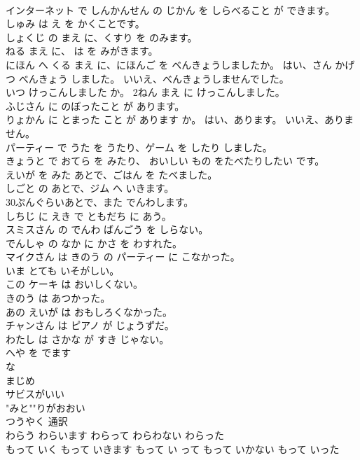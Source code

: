 \documentclass[8pt]{extreport}
\begin{document}
\begin{CJK}{UTF8}{min}
\\	インターネット で しんかんせん の じかん を しらべること が できます。	
\\	しゅみ は え を かくことです。	
\\	しょくじ の まえ に、くすり を のみます。	
\\	ねる まえ に、 は を みがきます。	
\\	にほん へ くる まえ に、にほんご を ベんきょうしましたか。 はい、さん かげつ べんきょう しました。 いいえ、べんきょうしませんでした。	
\\	いつ けっこんしました か。 2ねん まえ に けっこんしました。	
\\	ふじさん に のぼったこと が あります。	
\\	りょかん に とまった こと が あります か。 はい、あります。 いいえ、ありません。	
\\	パーティー で うた を うたり、ゲーム を したり しました。	
\\	きょうと で おてら を みたり、 おいしい もの をたべたりしたい です。	
\\	えいが を みた あとで、ごはん を たべました。	
\\	しごと の あとで、ジム へ いきます。	
\\	30ぷんぐらいあとで、また でんわします。	
\\	しちじ に えき で ともだち に あう。	
\\	スミスさん の でんわ ばんごう を しらない。	
\\	でんしゃ の なか に かさ を わすれた。	
\\	マイクさん は きのう の パーティー に こなかった。	
\\	いま とても いそがしい。	
\\	この ケーキ は おいしくない。	
\\	きのう は あつかった。	
\\	あの えいが は おもしろくなかった。	
\\	チャンさん は ピアノ が じょうずだ。	
\\	わたし は さかな が すき じゃない。	
\\	へや を でます	
\\	な 
\\	まじめ	
\\	サビスがいい	
\\	"みと""りがおおい
\\	つうやく	通訳
\\	わらう	わらいます	わらって	わらわない	わらった	
\\	もって いく	もって いきます	もって い って	もって いかない	もって いった	

\end{CJK}
\end{document}
